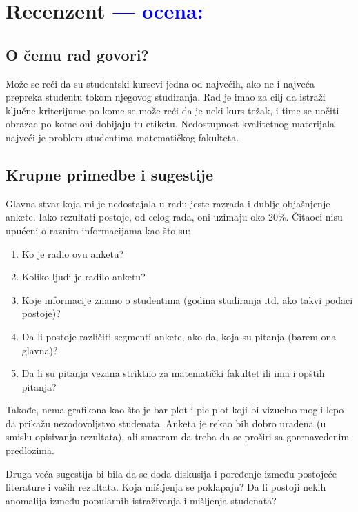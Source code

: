 \documentclass[a4paper]{report}
\newcommand{\odgovor}[1]{\textcolor{blue}{#1}}
\begin{document}
\chapter{Recenzent \odgovor{--- ocena:} }


\section{O čemu rad govori?}
Može se reći da su studentski kursevi jedna od najvećih, ako ne i najveća prepreka studentu tokom njegovog studiranja. Rad je imao za cilj da istraži ključne kriterijume po kome se može reći da je neki kurs težak, i time se uočiti obrazac po kome oni dobijaju tu etiketu. Nedostupnost kvalitetnog materijala najveći je problem studentima matematičkog fakulteta.

\section{Krupne primedbe i sugestije}
Glavna stvar koja mi je nedostajala u radu jeste razrada i dublje objašnjenje ankete. Iako rezultati postoje, od celog rada, oni uzimaju oko 20\%. Čitaoci nisu upućeni o raznim informacijama kao što su:
\begin{enumerate}
\item Ko je radio ovu anketu?
\item Koliko ljudi je radilo anketu?
\item Koje informacije znamo o studentima (godina studiranja itd. ako takvi podaci postoje)?
\item Da li postoje različiti segmenti ankete, ako da, koja su pitanja (barem ona glavna)?
\item Da li su pitanja vezana striktno za matematički fakultet ili ima i opštih pitanja?
\end{enumerate}
Takođe, nema grafikona kao što je bar plot i pie plot koji bi vizuelno mogli lepo da prikažu nezodovoljstvo studenata. Anketa je rekao bih dobro urađena (u smislu opisivanja rezultata), ali smatram da treba da se proširi sa gorenavedenim predlozima.
\newline

Druga veća sugestija bi bila da se doda diskusija i poređenje između postojeće literature i vaših rezultata. Koja mišljenja se poklapaju? Da li postoji nekih anomalija između popularnih istraživanja i mišljenja studenata?
\newline
\end{document}
